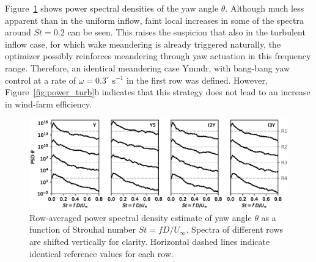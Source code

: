 \documentclass[energies,article,submit,moreauthors,latex,10pt,a4paper]{mdpi}
\begin{document}
Figure~\ref{fig:spec_turbulent} shows power spectral densities of the yaw angle $\theta$. Although much less apparent than in the uniform inflow, faint local increases in some of the spectra around $St = 0.2$ can be seen. This raises the suspicion that also in the turbulent inflow case, for which wake meandering is already triggered naturally, the optimizer possibly reinforces meandering through yaw actuation in this frequency range. Therefore, an identical meandering case Ymndr, with bang-bang yaw control at a rate of $\omega = 0.3^\circ$ s$^{-1}$ in the first row was defined. However, Figure~\ref{fig:power_turb}b indicates that this strategy does not lead to an increase in wind-farm efficiency. 
\begin{figure}
	\includegraphics[width=\textwidth]{figure15}
	\caption{Row-averaged power spectral density estimate of yaw angle $\theta$ as a function of Strouhal number $St = f D/U_\infty$. Spectra of different rows are shifted vertically for clarity. Horizontal dashed lines indicate identical reference values for each row.\label{fig:spec_turbulent}}
\end{figure}
\end{document}
